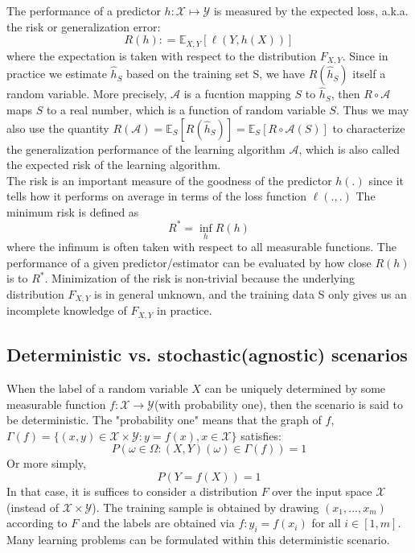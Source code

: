 \noindent The performance of a predictor  $h:\mathcal{X}\mapsto\mathcal{Y}$ is measured by the expected loss, a.k.a. the risk or generalization error:
\begin{equation}
R(h): =\mathbb{E}_{X,Y}[\ell(Y, h(X))]
\end{equation}
where the expectation is taken with respect to the distribution $F_{X,Y}$. Since in practice we estimate $\hat{h}_S$ based on the training set S, we have $R(\hat{h}_S)$ itself a random variable. More precisely, $\mathcal{A}$ is a fucntion mapping $S$ to $\hat{h}_S$, then $R\circ \mathcal{A}$ maps $S$ to a real number, which is a function of random variable $S$. Thus we may also use the quantity $R(\mathcal{A})=\mathbb{E}_{S}[R(\hat{h}_S)]=\mathbb{E}_{S}[R\circ \mathcal{A}(S)]$
to characterize the generalization performance of the learning algorithm $\mathcal{A}$, which is also called the expected risk of the learning algorithm.\\

\noindent The risk is an important measure of the goodness of the predictor $h(.)$ since it tells how it performs on average in terms of the loss function $\ell(.,.)$ The minimum risk is defined as
\begin{equation}
R^*= \inf_h{R(h)}
\end{equation}
where the infimum is often taken with respect to all measurable functions. The performance of a given predictor/estimator can be evaluated by how close $R(h)$ is to $R^*$. Minimization of the risk is non-trivial because the underlying distribution $F_{X,Y}$ is in general unknown, and the training data S only gives us an incomplete knowledge of $F_{X,Y}$ in practice.

\subsection{Deterministic vs. stochastic(agnostic) scenarios}
When the label of a random variable $X$  can be uniquely determined by some measurable function $f: \mathcal{X} \to \mathcal{Y}$(with probability one), then the scenario is said to be deterministic. The "probability one" means that the graph of $f$, $\Gamma(f)=\{(x,y)\in \mathcal{X}\times \mathcal{Y}: y=f(x), x\in \mathcal{X}\}$ satisfies:
\begin{equation}
P(\omega \in \Omega: (X,Y)(\omega) \in \Gamma(f)) = 1
\end{equation}
Or more simply,
\begin{equation}
P(Y=f(X))=1
\end{equation}
In that case, it is suffices to consider a distribution $F$ over the input space $\mathcal{X}$ (instead of  $\mathcal{X}\times\mathcal{Y}$). The training sample is obtained by drawing $(x_1,..., x_m)$ according to $F$ and the labels are obtained via $f: y_i=f(x_i)$ for all $i \in [1, m]$. Many learning problems can be formulated within this deterministic scenario.\\

